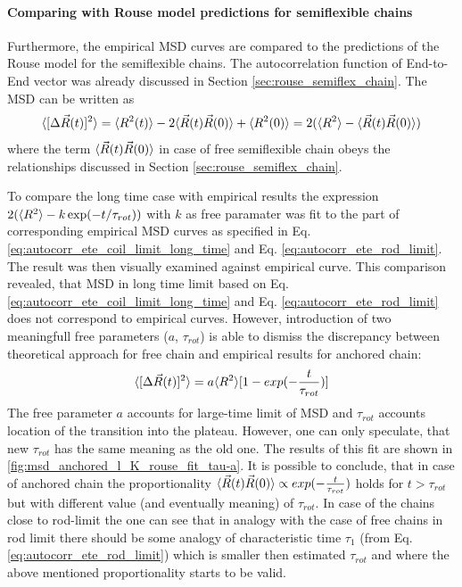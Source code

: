 \documentclass[
    paper=A4,pagesize=automedia,fontsize=12pt,
    BCOR=15mm,DIV=22,
    twoside,headinclude,footinclude=false,
    fleqn,             %
    bibliography=totocnumbered,          %
    listof=totoc,                %
    listof=flat,                 %
    cleardoublepage=empty      %
    numbers=endperiod
]{scrartcl}
\begin{document}
\FloatBarrier

\paragraph{Comparing with Rouse model predictions for semiflexible chains}

Furthermore, the empirical MSD curves are compared to the predictions
of the Rouse model for the semiflexible chains. The autocorrelation function
of End-to-End vector was already discussed in Section \ref{sec:rouse_semiflex_chain}.
The MSD can be written as 
$$\langle[\Delta \vec{R}(t)]^2\rangle = \langle R^2(t)\rangle - 2 \langle\vec{R}(t)\vec{R}(0)\rangle + \langle R^2(0)\rangle = 2(\langle R^2\rangle - \langle\vec{R}(t)\vec{R}(0)\rangle)$$
where the term $\langle\vec{R}(t)\vec{R}(0)\rangle$ in case of free semiflexible chain obeys 
the relationships discussed in Section \ref{sec:rouse_semiflex_chain}.

To compare the long time case with empirical results the expression
$2(\langle R^2\rangle - k \exp(-t/\tau_{rot}))$ with $k$ as free paramater was fit 
to the part of corresponding empirical MSD curves as specified in 
Eq. \ref{eq:autocorr_ete_coil_limit_long_time} and Eq. \ref{eq:autocorr_ete_rod_limit}.
The result was then visually examined against empirical curve.
This comparison revealed, that MSD in long time limit based on 
Eq. \ref{eq:autocorr_ete_coil_limit_long_time} and 
Eq. \ref{eq:autocorr_ete_rod_limit} does not correspond to empirical curves.
However, introduction of two meaningfull free parameters ($a$, $\tau_{rot}$) is able to dismiss
the discrepancy between theoretical approach for free chain and empirical 
results for anchored chain:
\begin{equation}
    \label{eq:adjusted_rouse_model_ete}
    \langle[\Delta \vec{R}(t)]^2\rangle  = a\langle R^2\rangle[1 - exp(-\frac{t}{\tau_{rot}})]
\end{equation}
The free parameter $a$ accounts for large-time limit of MSD and $\tau_{rot}$ 
accounts location of the transition into the plateau. However, one
can only speculate, that new $\tau_{rot}$ has the same meaning
as the old one. The results of this fit are shown in 
\autoref{fig:msd_anchored_l_K_rouse_fit_tau-a}.
It is possible to conclude, that in case of anchored chain the proportionality
$\langle\vec{R}(t)\vec{R}(0)\rangle \propto exp(-\frac{t}{\tau_{rot}})$
holds for $t>\tau_{rot}$ but with different value (and eventually meaning) of $\tau_{rot}$.
In case of the chains close to rod-limit the one can see that in analogy with 
the case of free chains in rod limit there should be some analogy of 
characteristic time $\tau_1$ (from Eq. \ref{eq:autocorr_ete_rod_limit}) which 
is smaller then estimated $\tau_{rot}$ and where the above mentioned 
proportionality starts to be valid.
\end{document}
